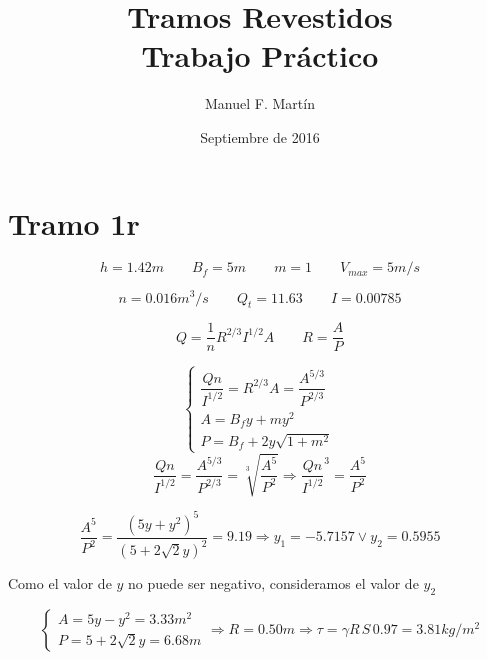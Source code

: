 \documentclass[10.5pt]{article}
\begin{document}
\date{Septiembre de 2016}
\title{Tramos Revestidos\\Trabajo Práctico}
\author{Manuel F. Martín}

\maketitle


\section*{Tramo 1r}


\begin{equation*}
  h = 1.42 m
 \qquad
  B_{f} = 5 m
 \qquad
  m = 1
 \qquad
  V_{max} = 5 m/s
\end{equation*}

\begin{equation*}
  n = 0.016 m^3/s
 \qquad
  Q_{t} = 11.63
 \qquad
  I = 0.00785
\end{equation*}

\begin{equation*}
 Q = \frac{1}{n} R^{2/3} I^{1/2} A
 \qquad
 R = \frac{A}{P}
\end{equation*}

\begin{equation*}
  \begin{cases}
    \dfrac{Q n}{I^{1/2}} = R^{2/3} A = \dfrac{A^{5/3}}{P^{2/3}} \\
    A = B_{f}y + m y^{2} \\
    P = B_{f} + 2 y \sqrt{1 + m^{2}}
  \end{cases}
\end{equation*}
\begin{equation*}
  \dfrac{Q n}{I^{1/2}} = \dfrac{A^{5/3}}{P^{2/3}} = \sqrt[3]{\dfrac{A^{5}}{P^{2}}}
  \Rightarrow
  \dfrac{Q n}{I^{1/2}}^{3} = \dfrac{A^{5}}{P^{2}}
\end{equation*}

\begin{equation*}
  \dfrac{A^{5}}{P^{2}} = \dfrac{(5 y + y^{2})^{5}}{(5 + 2 \sqrt{2} y)^{2}} = 9.19
  \Rightarrow
  y_{1} = -5.7157 \vee y_{2} = 0.5955
\end{equation*}


Como el valor de $y$ no puede ser negativo, consideramos el valor de $y_{2}$

\begin{equation*}
  \begin{cases}
    A = 5 y - y^{2} = 3.33 m^{2} \\
    P = 5 + 2 \sqrt{2} y = 6.68 m
  \end{cases}
  \Rightarrow
  R = 0.50 m
  \Rightarrow
  \tau = \gamma R \, S \, 0.97 = 3.81 kg/m^{2}
\end{equation*}
\end{document}
